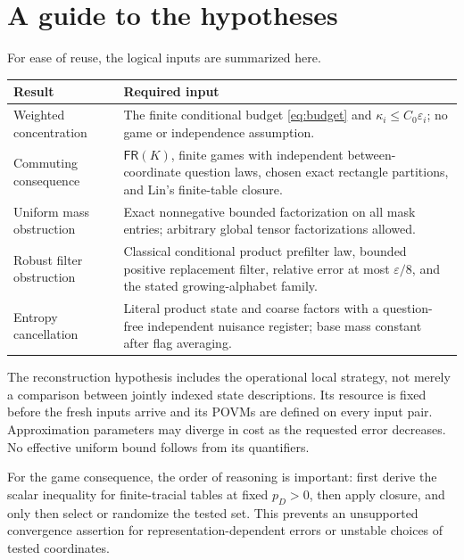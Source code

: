 \documentclass[11pt,reqno]{amsart}
\numberwithin{equation}{section}
\theoremstyle{definition}
\theoremstyle{remark}
\newcommand{\eps}{\varepsilon}
\newcommand{\FR}{\mathsf{FR}}
\begin{document}
\section{A guide to the hypotheses}\label{app:hypotheses}
For ease of reuse, the logical inputs are summarized here.
\begin{center}
\small
\begin{tabular}{p{39mm}p{99mm}}
\toprule
Result & Required input\\
\midrule
Weighted concentration &
The finite conditional budget \eqref{eq:budget} and
\(\kappa_i\le C_0\eps_i\); no game or independence assumption.\\[3pt]
Commuting consequence &
\(\FR(K)\), finite games with independent between-coordinate question laws, chosen exact rectangle partitions, and Lin's finite-table closure.\\[3pt]
Uniform mass obstruction &
Exact nonnegative bounded factorization on all mask entries; arbitrary global tensor factorizations allowed.\\[3pt]
Robust filter obstruction &
Classical conditional product prefilter law, bounded positive replacement filter, relative error at most \(\eps/8\), and the stated growing-alphabet family.\\[3pt]
Entropy cancellation &
Literal product state and coarse factors with a question-free independent nuisance register; base mass constant after flag averaging.\\
\bottomrule
\end{tabular}
\end{center}
\smallskip

The reconstruction hypothesis includes the operational local strategy, not merely a comparison between jointly indexed state descriptions. Its resource is fixed before the fresh inputs arrive and its POVMs are defined on every input pair. Approximation parameters may diverge in cost as the requested error decreases. No effective uniform bound follows from its quantifiers.

For the game consequence, the order of reasoning is important: first derive the scalar inequality for finite-tracial tables at fixed \(p_D>0\), then apply closure, and only then select or randomize the tested set. This prevents an unsupported convergence assertion for representation-dependent errors or unstable choices of tested coordinates.

\end{document}
